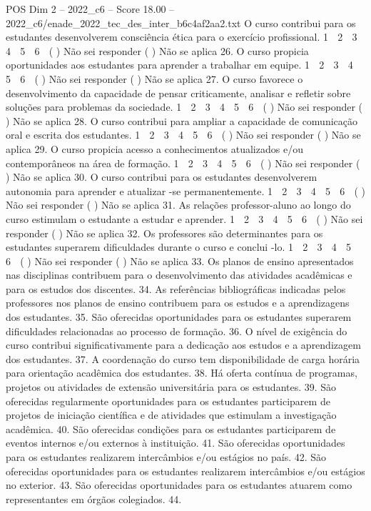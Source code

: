 \begin{textsample}{POS Dim 2 – 2022\_c6 – Score 18.00 – 2022\_c6/enade\_2022\_tec\_des\_inter\_b6c4af2aa2.txt}
O curso contribui para os estudantes desenvolverem consciência ética para o exercício profissional. 1 ⃝ 2 ⃝ 3 ⃝ 4 ⃝ 5 ⃝ 6 ⃝ ( ) Não sei responder ( ) Não se aplica 26.
O curso propicia oportunidades aos estudantes para aprender a trabalhar em equipe. 1 ⃝ 2 ⃝ 3 ⃝ 4 ⃝ 5 ⃝ 6 ⃝ ( ) Não sei responder ( ) Não se aplica 27.
O curso favorece o desenvolvimento da capacidade de pensar criticamente, analisar e refletir sobre soluções para problemas da sociedade. 1 ⃝ 2 ⃝ 3 ⃝ 4 ⃝ 5 ⃝ 6 ⃝ ( ) Não sei responder ( ) Não se aplica 28.
O curso contribui para ampliar a capacidade de comunicação oral e escrita dos estudantes. 1 ⃝ 2 ⃝ 3 ⃝ 4 ⃝ 5 ⃝ 6 ⃝ ( ) Não sei responder ( ) Não se aplica 29.
O curso propicia acesso a conhecimentos atualizados e/ou contemporâneos na área de formação. 1 ⃝ 2 ⃝ 3 ⃝ 4 ⃝ 5 ⃝ 6 ⃝ ( ) Não sei responder ( ) Não se aplica 30.
O curso contribui para os estudantes desenvolverem autonomia para aprender e atualizar -se permanentemente. 1 ⃝ 2 ⃝ 3 ⃝ 4 ⃝ 5 ⃝ 6 ⃝ ( ) Não sei responder ( ) Não se aplica 31.
As relações professor-aluno ao longo do curso estimulam o estudante a estudar e aprender. 1 ⃝ 2 ⃝ 3 ⃝ 4 ⃝ 5 ⃝ 6 ⃝ ( ) Não sei responder ( ) Não se aplica 32.
Os professores são determinantes para os estudantes superarem dificuldades durante o curso e conclui -lo. 1 ⃝ 2 ⃝ 3 ⃝ 4 ⃝ 5 ⃝ 6 ⃝ ( ) Não sei responder ( ) Não se aplica 33.
Os planos de ensino apresentados nas disciplinas contribuem para o desenvolvimento das atividades acadêmicas e para os estudos dos discentes. 34.
As referências bibliográficas indicadas pelos professores nos planos de ensino contribuem para os estudos e a aprendizagens dos estudantes. 35.
São oferecidas oportunidades para os estudantes superarem dificuldades relacionadas ao processo de formação. 36.
O nível de exigência do curso contribui significativamente para a dedicação aos estudos e a aprendizagem dos estudantes. 37.
A coordenação do curso tem disponibilidade de carga horária para orientação acadêmica dos estudantes. 38.
Há oferta contínua de programas, projetos ou atividades de extensão universitária para os estudantes. 39.
São oferecidas regularmente oportunidades para os estudantes participarem de projetos de iniciação científica e de atividades que estimulam a investigação acadêmica. 40.
São oferecidas condições para os estudantes participarem de eventos internos e/ou externos à instituição. 41.
São oferecidas oportunidades para os estudantes realizarem intercâmbios e/ou estágios no país. 42.
São oferecidas oportunidades para os estudantes realizarem intercâmbios e/ou estágios no exterior. 43.
São oferecidas oportunidades para os estudantes atuarem como representantes em órgãos colegiados. 44.

\end{textsample}
